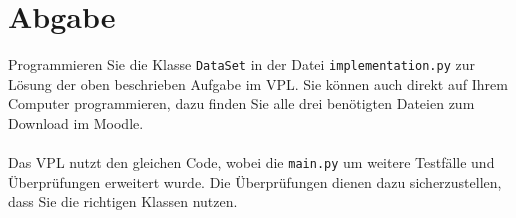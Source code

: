 \documentclass[
    12pt, %
    a4paper, %
    parskip=full, %
    ]{scrartcl}
\begin{document}
    \section{Abgabe}
    Programmieren Sie die Klasse \texttt{DataSet} in der Datei \texttt{implementation.py} zur Lösung der oben beschrieben Aufgabe im VPL.
    Sie können auch direkt auf Ihrem Computer programmieren, dazu finden Sie alle drei benötigten Dateien zum Download im Moodle.\\
    \\
    Das VPL nutzt den gleichen Code, wobei die \texttt{main.py} um weitere Testfälle und Überprüfungen erweitert wurde.
    Die Überprüfungen dienen dazu sicherzustellen, dass Sie die richtigen Klassen nutzen.\\
    
\end{document}
